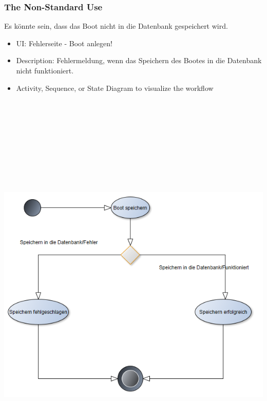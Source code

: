 \documentclass[12pt]{article}
\theoremstyle{definition}
\begin{document}
\subsubsection{The Non-Standard Use}
Es könnte sein, dass das Boot nicht in die Datenbank gespeichert wird.
\begin{itemize}
	\item UI: Fehlerseite - Boot anlegen!
	\item Description: Fehlermeldung, wenn das Speichern des Bootes in die Datenbank nicht funktioniert.
	\item Activity, Sequence, or State Diagram to visualize the workflow
\end{itemize}
\begin{center}\includegraphics[width=15cm,height=20cm,keepaspectratio]{Boot_anlegen_Fehler.PNG}\end{center}
\end{document}
